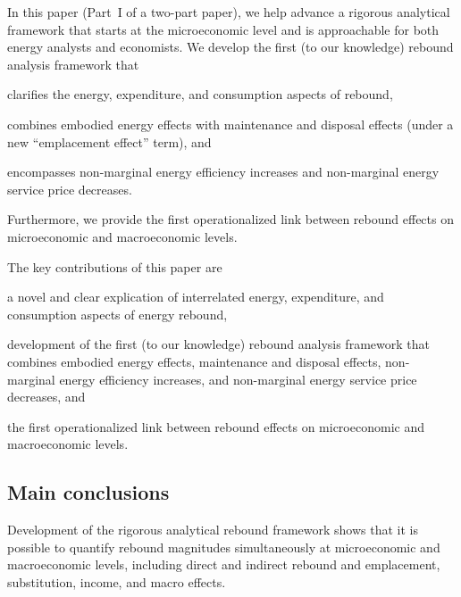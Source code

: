 \documentclass[12pt]{article}    %
\begin{document}
In this paper (Part~I of a two-part paper),
we help advance a rigorous analytical framework
that starts at the microeconomic level
and is approachable for both energy analysts and economists. 
We develop the first (to our knowledge)
rebound analysis framework that 
%
\begin{enumerate*}[label={(\roman*)}]
	
  \item clarifies the energy, expenditure, and consumption aspects of rebound,

  \item combines 
        embodied energy effects with
        maintenance and disposal effects
        (under a new ``emplacement effect'' term), and

  \item encompasses non-marginal energy efficiency increases and
        non-marginal energy service price decreases.
  
\end{enumerate*}
%
Furthermore, we provide the first operationalized link between 
rebound effects on microeconomic and macroeconomic levels.

The key contributions of this paper are 
%
\begin{enumerate*}[label={(\roman*)}]
	
	\item a novel and clear explication of interrelated
	      energy, expenditure, and consumption
	      aspects of energy rebound,
	
  \item development of the first (to our knowledge)
        rebound analysis framework that combines 
        embodied energy effects, 
        maintenance and disposal effects, 
        non-marginal energy efficiency increases, and 
        non-marginal energy service price decreases, and

  \item the first operationalized link between 
        rebound effects on microeconomic and macroeconomic levels.
        
\end{enumerate*}

\subsection*{Main conclusions}
\label{sec:conclusions}

Development of the rigorous analytical rebound framework shows that
it is possible to quantify rebound magnitudes simultaneously
at microeconomic and macroeconomic levels, including 
direct and indirect rebound 
and emplacement, substitution, income, and macro effects.
\end{document}
